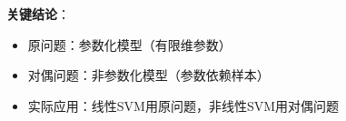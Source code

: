 \documentclass[a4paper,12pt]{book}
\begin{document}
\begin{enumerate}[label=\arabic*.]
    \textbf{关键结论}：
    \begin{itemize}
        \item 原问题：参数化模型（有限维参数）
        \item 对偶问题：非参数化模型（参数依赖样本）
        \item 实际应用：线性SVM用原问题，非线性SVM用对偶问题
    \end{itemize}
\end{enumerate}
\end{document}
